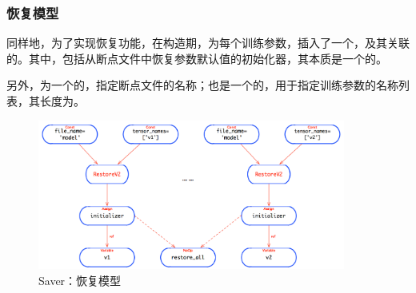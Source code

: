 \begin{content}
\subsubsection{恢复模型}

同样地，为了实现恢复功能，在构造期，为每个训练参数，插入了一个，及其关联的。其中，包括从断点文件中恢复参数默认值的初始化器，其本质是一个的。 

另外，为一个的，指定断点文件的名称；也是一个的，用于指定训练参数的名称列表，其长度为。

\begin{figure}[!htbp]
\centering
\includegraphics[width=0.9\textwidth]{figures/py-saver-restore-model.png}
\caption{Saver：恢复模型}
 \label{fig:py-saver-restore-model}
\end{figure}

\end{content}
